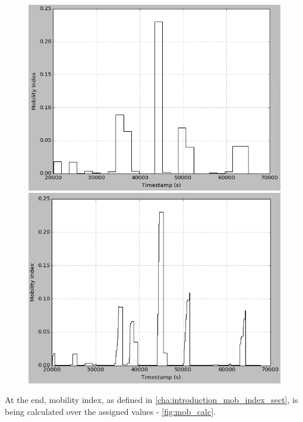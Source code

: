 \begin{figure}
	\centering
	\begin{minipage}{.45\textwidth}
		\centering
		\includegraphics[width=.9\linewidth]{images/mob_calc1.png}
	\end{minipage}%
	\begin{minipage}{.45\textwidth}
		\centering
		\includegraphics[width=.9\linewidth]{images/mob_calc2.png}
	\end{minipage}
	\label{fig:mob_calc}
\end{figure}

\FloatBarrier

At the end, mobility index, as defined in \autoref{cha:introduction_mob_index_sect}, is being calculated over the assigned values - \autoref{fig:mob_calc}. 

